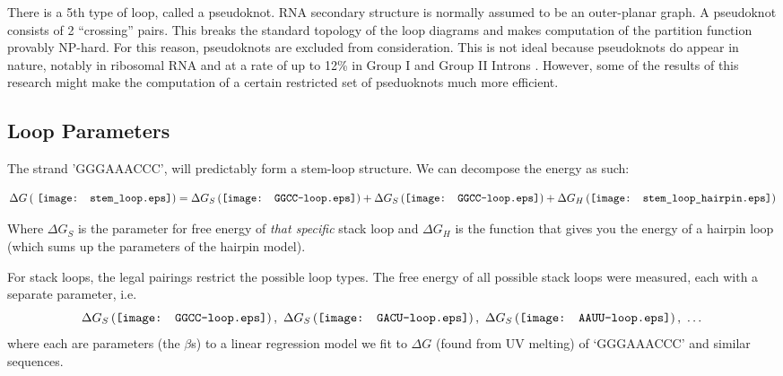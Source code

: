 There is a 5th type of loop, called a pseudoknot. RNA secondary
structure is normally assumed to be an outer-planar graph. A
pseudoknot consists of 2 ``crossing'' pairs. This breaks the standard
topology of the loop diagrams and makes computation of the partition
function provably NP-hard. For this reason, pseudoknots
are excluded from consideration. This is not ideal because pseudoknots
do appear in nature, notably in ribosomal RNA and at a rate of up to
12\% in Group I and Group II Introns
\cite{mathews1999expanded}. However, some of the results of this
research might make the computation of a certain restricted set of
pseduoknots much more efficient.


\subsection{Loop Parameters} 

The strand 'GGGAAACCC', will predictably form a stem-loop
structure. We can decompose the energy as such:

\begin{equation}
\Delta G \left ( \vcenter{\hbox{ \texttt{[image: stem\_loop.eps]}}}
 \right ) =
\Delta G_S \left ( \vcenter{\hbox{\texttt{[image: GGCC-loop.eps]}}}
\right ) +
\Delta G_S \left ( \vcenter{\hbox{\texttt{[image: GGCC-loop.eps]}}}
\right ) + 
\Delta G_H \left (\vcenter{\hbox{\texttt{[image: stem\_loop\_hairpin.eps]}}}
\right )
\label{eq:decomposition}
\end{equation}

Where $\Delta G_S$ is the parameter for free energy of \emph{that
  specific} stack loop and $\Delta G_H$ is the function that gives you
the energy of a hairpin loop (which sums up the parameters of the
hairpin model).

For stack loops, the legal pairings restrict the possible loop
types. The free energy of all possible stack loops were measured, each
with a separate parameter, i.e.
\begin{equation}
\Delta G_S \left ( \vcenter{\hbox{\texttt{[image: GGCC-loop.eps]}}}
\right ), \  
\Delta G_S \left ( \vcenter{\hbox{\texttt{[image: GACU-loop.eps]}}}
\right ), \ 
\Delta G_S \left ( \vcenter{\hbox{\texttt{[image: AAUU-loop.eps]}}}
\right ), \ \dots
\end{equation}
where each are parameters (the $\beta$s) to a linear regression model
we fit to $\Delta G$ (found from UV melting) of `GGGAAACCC' and
similar sequences.

